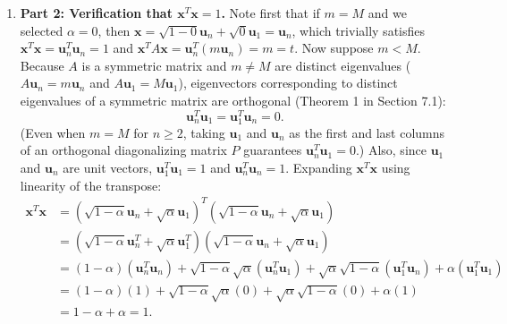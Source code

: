 \documentclass[11pt, letterpaper]{article}
\theoremstyle{definition}
\theoremstyle{remark}
\begin{document}
\begin{enumerate}[leftmargin=2em]
    \item \textbf{Part 2: Verification that $\mathbf{x}^T \mathbf{x} = 1$.}
    Note first that if $m = M$ and we selected $\alpha = 0$, then $\mathbf{x} = \sqrt{1 - 0}\mathbf{u}_n + \sqrt{0}\mathbf{u}_1 = \mathbf{u}_n$, which trivially satisfies $\mathbf{x}^T \mathbf{x} = \mathbf{u}_n^T \mathbf{u}_n = 1$ and $\mathbf{x}^T A \mathbf{x} = \mathbf{u}_n^T (m\mathbf{u}_n) = m = t$.
    Now suppose $m < M$. Because $A$ is a symmetric matrix and $m \neq M$ are distinct eigenvalues ($A\mathbf{u}_n = m\mathbf{u}_n$ and $A\mathbf{u}_1 = M\mathbf{u}_1$), eigenvectors corresponding to distinct eigenvalues of a symmetric matrix are orthogonal (Theorem 1 in Section 7.1):
    \[
    \mathbf{u}_n^T \mathbf{u}_1 = \mathbf{u}_1^T \mathbf{u}_n = 0.
    \]
    (Even when $m = M$ for $n \ge 2$, taking $\mathbf{u}_1$ and $\mathbf{u}_n$ as the first and last columns of an orthogonal diagonalizing matrix $P$ guarantees $\mathbf{u}_n^T \mathbf{u}_1 = 0$.) Also, since $\mathbf{u}_1$ and $\mathbf{u}_n$ are unit vectors, $\mathbf{u}_1^T \mathbf{u}_1 = 1$ and $\mathbf{u}_n^T \mathbf{u}_n = 1$. Expanding $\mathbf{x}^T \mathbf{x}$ using linearity of the transpose:
    \begin{align*}
    \mathbf{x}^T \mathbf{x} &= \left(\sqrt{1 - \alpha}\mathbf{u}_n + \sqrt{\alpha}\mathbf{u}_1\right)^T \left(\sqrt{1 - \alpha}\mathbf{u}_n + \sqrt{\alpha}\mathbf{u}_1\right) \\
    &= \left(\sqrt{1 - \alpha}\mathbf{u}_n^T + \sqrt{\alpha}\mathbf{u}_1^T\right)\left(\sqrt{1 - \alpha}\mathbf{u}_n + \sqrt{\alpha}\mathbf{u}_1\right) \\
    &= (1 - \alpha)(\mathbf{u}_n^T \mathbf{u}_n) + \sqrt{1 - \alpha}\sqrt{\alpha}(\mathbf{u}_n^T \mathbf{u}_1) + \sqrt{\alpha}\sqrt{1 - \alpha}(\mathbf{u}_1^T \mathbf{u}_n) + \alpha(\mathbf{u}_1^T \mathbf{u}_1) \\
    &= (1 - \alpha)(1) + \sqrt{1 - \alpha}\sqrt{\alpha}(0) + \sqrt{\alpha}\sqrt{1 - \alpha}(0) + \alpha(1) \\
    &= 1 - \alpha + \alpha = 1.
    \end{align*}


\end{enumerate}
\end{document}
